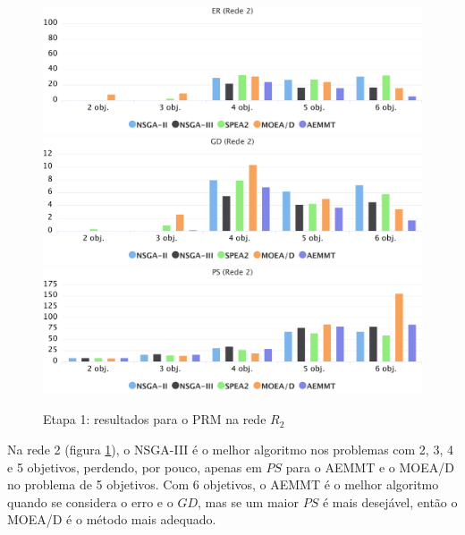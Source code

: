 \begin{figure}[!htbp]
	\caption{Etapa 1: resultados para o PRM na rede $R_2$}
	\label{fig_exp1_prm_r2}
	\includegraphics[width=1\textwidth]{cap_experimentos/figs/etapa1/er-mrp-r2}
	\includegraphics[width=1\textwidth]{cap_experimentos/figs/etapa1/gd-mrp-r2}
	\includegraphics[width=1\textwidth]{cap_experimentos/figs/etapa1/ps-mrp-r2}
\end{figure}

Na rede 2 (figura \ref{fig_exp1_prm_r2}), o NSGA-III é o melhor algoritmo nos problemas com 2, 3, 4 e 5 objetivos, perdendo, por pouco, apenas em $PS$ para o AEMMT e o MOEA/D no problema de 5 objetivos. Com 6 objetivos, o AEMMT é o melhor algoritmo quando se considera o erro e o $GD$, mas se um maior $PS$ é mais desejável, então o MOEA/D é o método mais adequado.

